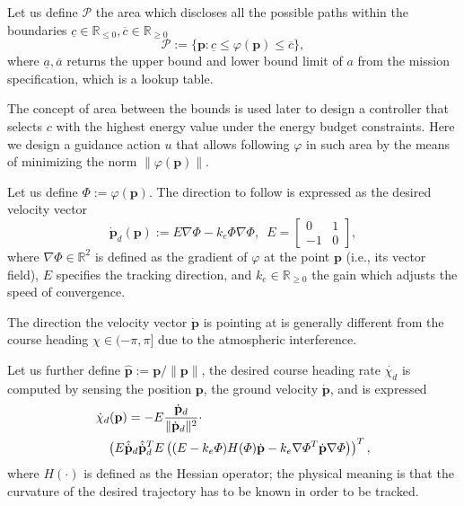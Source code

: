 \documentclass[letterpaper,10pt,conference]{ieeeconf}
\begin{document}
Let us define $\mathcal{P}$ the area which discloses all the possible paths within the boundaries $\underline{c}\in\mathbb{R}_{\leq 0},\overline{c}\in\mathbb{R}_{\geq 0}$
\begin{equation}\label{eq:area}
  \mathcal{P}:=\{\mathbf{p}:\underline{c}\leq\varphi(\mathbf{p})\leq\overline{c}\},
\end{equation}
where $\underline{a},\overline{a}$ returns the upper bound and lower bound limit of $a$ from the mission specification, which is a lookup table.

The concept of area between the bounds is used later to design a controller that selects $c$ with the highest energy value under the energy budget constraints. Here we design a guidance action $u$ that allows following $\varphi$ in such area by the means of minimizing the norm $\|\varphi(\mathbf{p})\|$.

Let us define $\varPhi:=\varphi(\mathbf{p})$. The direction to follow is expressed as the desired velocity vector
\begin{equation}\label{eq:pd}
  \dot{\mathbf{p}}_d(\mathbf{p}):=E\nabla\varPhi-k_e\varPhi\nabla\varPhi,\,\,\,E=\begin{bmatrix}
    0&1\\-1&0
  \end{bmatrix},
\end{equation}
where $\nabla\varPhi\in\mathbb{R}^2$ is defined as the gradient of $\varphi$ at the point $\mathbf{p}$ (i.e., its vector field), $E$ specifies the tracking direction, and $k_e\in\mathbb{R}_{\geq 0}$ the gain which adjusts the speed of convergence.

The direction the velocity vector $\dot{\mathbf{p}}$ is pointing at is generally different from the course heading $\chi\in(-\pi,\pi]$ due to the atmospheric interference.

Let us further define $\hat{\mathbf{p}}:=\mathbf{p}/\|\mathbf{p}\|$, the desired course heading rate $\dot{\chi_d}$ is computed by sensing the position $\mathbf{p}$, the ground velocity $\dot{\mathbf{p}}$, and is expressed
\begin{equation}\label{eq:chid}\begin{split}
  &\dot{\chi}_d(\mathbf{p})=-E\frac{\dot{\mathbf{p}}_d}{\|\dot{\mathbf{p}}_d\|^2}\cdot\\
  &\hspace{2ex}\left( E\hat{\dot{\mathbf{p}}}_d\hat{\dot{\mathbf{p}}}_d^TE\left( (E-k_e\varPhi)H(\varPhi)\dot{\mathbf{p}}-k_e\nabla\varPhi^T\dot{\mathbf{p}}\nabla\varPhi \right) \right)^T,
\end{split}
\end{equation} 
where $H(\cdot)$ is defined as the Hessian operator; the physical meaning is that the curvature of the desired trajectory has to be known in order to be tracked.
\end{document}
